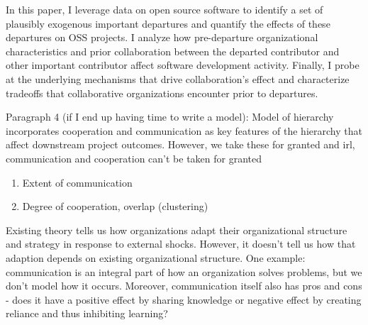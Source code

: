 \documentclass[12pt,notitlepage]{article}
\begin{document}
In this paper, I leverage data on open source software to identify a set of plausibly exogenous important departures and quantify the effects of these departures on OSS projects. I analyze how pre-departure organizational characteristics and prior collaboration between the departed contributor and other important contributor affect software development activity. Finally, I probe at the underlying mechanisms that drive collaboration's effect and characterize tradeoffs that collaborative organizations encounter prior to departures. 



\iffalse
Paragraph 4 (if I end up having time to write a model): 
Model of hierarchy incorporates cooperation and communication as key features of the hierarchy that affect downstream project outcomes. However, we take these for granted and irl, communication and cooperation can't be taken for granted
\begin{enumerate}
    \item Extent of communication 
    \item Degree of cooperation, overlap (clustering)
\end{enumerate}

Existing theory tells us how organizations adapt their organizational structure and strategy in response to external shocks. However, it doesn't tell us how that adaption depends on existing organizational structure. One example: communication is an integral part of how an organization solves problems, but we don't model how it occurs. Moreover, communication itself also has pros and cons - does it have a positive effect by sharing knowledge or negative effect by creating reliance and thus inhibiting learning?
\end{document}
